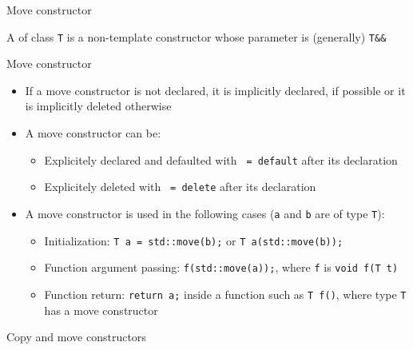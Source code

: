 \begin{frame}{Move constructor}{}
  \begin{definition}
    A  of class \lstinline!T! is a non-template constructor whose parameter is (generally) \lstinline!T&&!
  \end{definition}

  \begin{block}{Move constructor}
    \begin{itemize}
    \item
      If a move constructor is not declared, it is implicitly declared, if possible or it is implicitly deleted otherwise
    \item
      A move constructor can be:
      \begin{itemize}
      \item
        Explicitely declared and defaulted with \lstinline! = default! after its declaration
      \item
        Explicitely deleted with \lstinline! = delete! after its declaration
      \end{itemize}
    \item
      A move constructor is used in the following cases (\lstinline!a! and \lstinline!b! are of type \lstinline!T!):
      \begin{itemize}
      \item
        Initialization: \lstinline!T a = std::move(b);! or \lstinline!T a(std::move(b));!
      \item
        Function argument passing: \lstinline!f(std::move(a));!, where \lstinline!f! is \lstinline!void f(T t)!
      \item
        Function return: \lstinline!return a;! inside a function such as \lstinline!T f()!, where type \lstinline!T! has a move constructor
      \end{itemize}
    \end{itemize}
  \end{block}
\end{frame}

\begin{frame}{Copy and move constructors}{}
  \begin{example}
  \end{example}
\end{frame}

